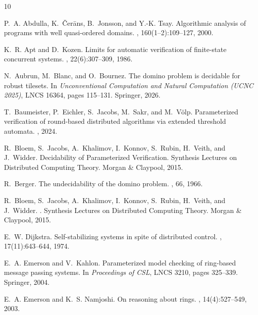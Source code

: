 \documentclass[11pt]{article}
\begin{document}

\begin{thebibliography}{10}

P.~A. Abdulla, K.~\v{C}er\={a}ns, B.~Jonsson, and Y.-K. Tsay.
\newblock Algorithmic analysis of programs with well quasi-ordered domains.
, 160(1--2):109--127, 2000.

K.~R. Apt and D.~Kozen.
\newblock Limits for automatic verification of finite-state concurrent systems.
, 22(6):307--309, 1986.

N.~Aubrun, M.~Blanc, and O.~Bournez.
\newblock The domino problem is decidable for robust tilesets.
\newblock In {\em Unconventional Computation and Natural Computation (UCNC 2025)}, LNCS 16364, pages 115--131. Springer, 2026.

T.~Baumeister, P.~Eichler, S.~Jacobs, M.~Sakr, and M.~V\"olp.
\newblock Parameterized verification of round-based distributed algorithms via extended threshold automata.
, 2024.

R.~Bloem, S.~Jacobs, A.~Khalimov, I.~Konnov, S.~Rubin, H.~Veith, and J.~Widder.
\newblock Decidability of Parameterized Verification.
\newblock Synthesis Lectures on Distributed Computing Theory. Morgan \& Claypool, 2015.

R.~Berger.
\newblock The undecidability of the domino problem.
, 66, 1966.

R.~Bloem, S.~Jacobs, A.~Khalimov, I.~Konnov, S.~Rubin, H.~Veith, and J.~Widder.
.
\newblock Synthesis Lectures on Distributed Computing Theory. Morgan \& Claypool, 2015.

E.~W. Dijkstra.
\newblock Self-stabilizing systems in spite of distributed control.
, 17(11):643--644, 1974.

E.~A. Emerson and V.~Kahlon.
\newblock Parameterized model checking of ring-based message passing systems.
\newblock In {\em Proceedings of CSL}, LNCS 3210, pages 325--339. Springer, 2004.

E.~A. Emerson and K.~S. Namjoshi.
\newblock On reasoning about rings.
, 14(4):527--549, 2003.


\end{thebibliography}
\end{document}

